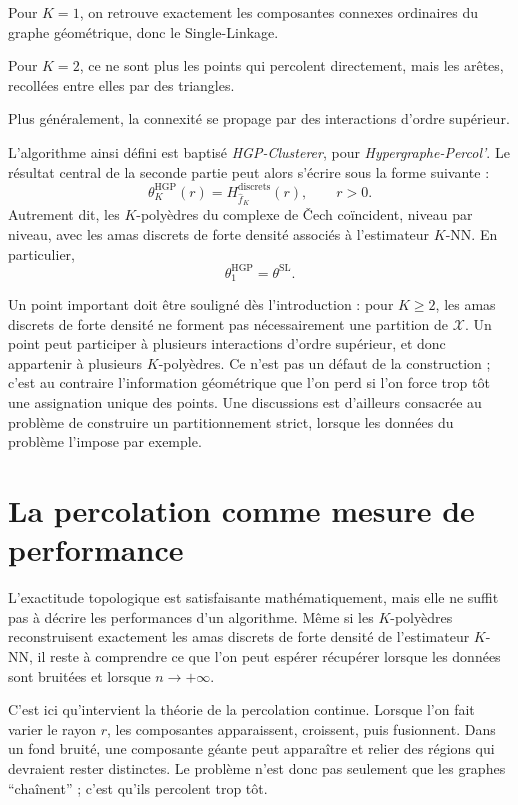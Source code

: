 Pour $K=1$, on retrouve exactement les composantes connexes ordinaires du graphe géométrique, donc le Single-Linkage. 

Pour $K=2$, ce ne sont plus les points qui percolent directement, mais les arêtes, recollées entre elles par des triangles.

Plus généralement, la connexité se propage par des interactions d'ordre supérieur.

L'algorithme ainsi défini est baptisé \emph{HGP-Clusterer}, pour
\emph{Hypergraphe-Percol'}.
Le résultat central de la seconde partie peut alors s'écrire sous la forme
suivante :
\[
    \theta^{\mathrm{HGP}}_K(r)
    =
    H^{\mathrm{discrets}}_{\widehat f_K}(r),
    \qquad r>0.
\]
Autrement dit, les $K$-polyèdres du complexe de \v{C}ech coïncident, niveau par
niveau, avec les amas discrets de forte densité associés à l'estimateur $K$-NN.
En particulier,
\[
    \theta^{\mathrm{HGP}}_1 = \theta^{\mathrm{SL}}.
\]


Un point important doit être souligné dès l'introduction : pour $K\geq2$, les
amas discrets de forte densité ne forment pas nécessairement une partition de
$\mathcal X$.
Un point peut participer à plusieurs interactions d'ordre supérieur, et donc appartenir à plusieurs $K$-polyèdres. 
Ce n'est pas un défaut de la construction ; c'est au contraire l'information géométrique que l'on perd si l'on force trop tôt une assignation unique des points.
Une discussions est d'ailleurs consacrée au problème de construire un partitionnement strict, lorsque les données du problème l'impose par exemple.

\section{La percolation comme mesure de performance}

L'exactitude topologique est satisfaisante mathématiquement, mais elle ne suffit pas à décrire les performances d'un algorithme. 
Même si les $K$-polyèdres reconstruisent exactement les amas discrets de forte densité de l'estimateur $K$-NN, il reste à comprendre ce que l'on peut espérer récupérer lorsque les données sont bruitées et lorsque $n\to+\infty$.

C'est ici qu'intervient la théorie de la percolation continue. 
Lorsque l'on fait varier le rayon $r$, les composantes apparaissent, croissent, puis fusionnent.
Dans un fond bruité, une composante géante peut apparaître et relier des régions qui devraient rester distinctes. Le problème n'est donc pas seulement que les graphes ``chaînent'' ; c'est qu'ils percolent trop tôt.


